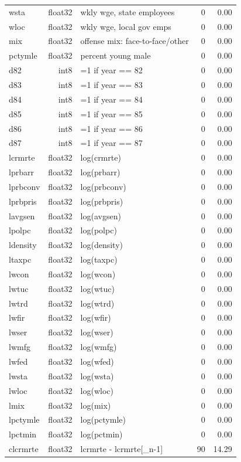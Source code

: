 \documentclass{article}
\begin{document}
\begin{longtable}{p{} r p{} r r}
wsta & float32 & wkly wge, state employees & 0 & 0.00 \\
wloc & float32 & wkly wge, local gov emps & 0 & 0.00 \\
mix & float32 & offense mix: face-to-face/other & 0 & 0.00 \\
pctymle & float32 & percent young male & 0 & 0.00 \\
d82 & int8 & =1 if year == 82 & 0 & 0.00 \\
d83 & int8 & =1 if year == 83 & 0 & 0.00 \\
d84 & int8 & =1 if year == 84 & 0 & 0.00 \\
d85 & int8 & =1 if year == 85 & 0 & 0.00 \\
d86 & int8 & =1 if year == 86 & 0 & 0.00 \\
d87 & int8 & =1 if year == 87 & 0 & 0.00 \\
lcrmrte & float32 & log(crmrte) & 0 & 0.00 \\
lprbarr & float32 & log(prbarr) & 0 & 0.00 \\
lprbconv & float32 & log(prbconv) & 0 & 0.00 \\
lprbpris & float32 & log(prbpris) & 0 & 0.00 \\
lavgsen & float32 & log(avgsen) & 0 & 0.00 \\
lpolpc & float32 & log(polpc) & 0 & 0.00 \\
ldensity & float32 & log(density) & 0 & 0.00 \\
ltaxpc & float32 & log(taxpc) & 0 & 0.00 \\
lwcon & float32 & log(wcon) & 0 & 0.00 \\
lwtuc & float32 & log(wtuc) & 0 & 0.00 \\
lwtrd & float32 & log(wtrd) & 0 & 0.00 \\
lwfir & float32 & log(wfir) & 0 & 0.00 \\
lwser & float32 & log(wser) & 0 & 0.00 \\
lwmfg & float32 & log(wmfg) & 0 & 0.00 \\
lwfed & float32 & log(wfed) & 0 & 0.00 \\
lwsta & float32 & log(wsta) & 0 & 0.00 \\
lwloc & float32 & log(wloc) & 0 & 0.00 \\
lmix & float32 & log(mix) & 0 & 0.00 \\
lpctymle & float32 & log(pctymle) & 0 & 0.00 \\
lpctmin & float32 & log(pctmin) & 0 & 0.00 \\
clcrmrte & float32 & lcrmrte - lcrmrte[\_n-1] & 90 & 14.29 \\

\end{longtable}
\end{document}
